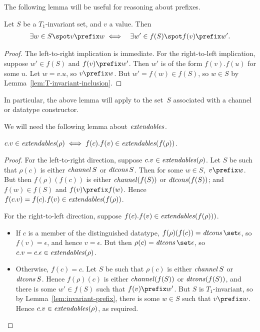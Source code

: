 
The following lemma will be useful for reasoning about prefixes.
%
\begin{lemma}
\label{lem:invariant-prefix}
Let $S$ be a $T_1$-invariant set, and $v$ a value.  Then
\begin{eqnarray*}
\exists w \in S \spot v \prefix w & \iff & 
  \exists w' \in f(S) \spot f(v) \prefix w'.
\end{eqnarray*}
\end{lemma}
%
\begin{proof}
The left-to-right implication is immediate.  For the right-to-left
implication, suppose $w' \in f(S)$ and $f(v) \prefix w'$.  Then $w'$ is of the
form $f(v).f(u)$ for some $u$.  Let $w = v.u$, so $v \prefix w$.  But $w' =
f(w) \in f(S)$, so $w \in S$ by Lemma~\ref{lem:T-invariant-inclusion}.
\end{proof}
%
In particular, the above lemma will apply to the set~$S$ associated with a
channel or datatype constructor. 

We will need the following lemma about $\mathop{\it extendables}$.  
%
\begin{lemma}\label{lem:extendables-f-rho}
$c.v \in \mathop{\it extendables}(\rho) \iff f(c).f(v) \in \mathop{\it extendables}(f(\rho))$.
\end{lemma}

\begin{proof}
For the left-to-right direction, suppose $c.v \in \mathop{\it extendables}(\rho)$.  Let
$S$ be such that $\rho(c)$ is either $\mathop{\it channel} S$ or $\mathop{\it dtcons} S$.  Then for
some $w \in S$,\, $v \prefix w$.  But then $f(\rho)(f(c))$ is either $\mathop{\it channel}
(f(S))$ or $\mathop{\it dtcons} (f(S))$; and $f(w) \in f(S)$ and $f(v) \prefix
f(w)$. Hence $f(c.v) = f(c).f(v) \in \mathop{\it extendables}(f(\rho))$.

For the right-to-left direction, suppose $f(c).f(v) \in
\mathop{\it extendables}(f(\rho)))$.
\begin{itemize}
\item If $c$ is a member of the distinguished datatype, $f(\rho)(f(c)) =
  \dtcons\set\epsilon$, so $f(v) = \epsilon$, and hence $v = \epsilon$.  But
  then $\rho(c) = \dtcons\set\epsilon$, so $c.v = c.\epsilon \in
  \mathop{\it extendables}(\rho)$.

\item Otherwise, $f(c) = c$.  Let $S$ be such that $\rho(c)$ is either
  $\mathop{\it channel} S$ or $\mathop{\it dtcons} S$.  Hence $f(\rho)(c)$ is either $\mathop{\it channel} (f(S))$
  or $\mathop{\it dtcons} (f(S))$, and there is some $w' \in f(S)$ such that $f(v) \prefix
  w'$.  But $S$ is $T_1$-invariant, so by Lemma~\ref{lem:invariant-prefix},
  there is some $w \in S$ such that $v \prefix w$.
  Hence $c.v \in \mathop{\it extendables}(\rho)$, as required.
\end{itemize}
\end{proof}

